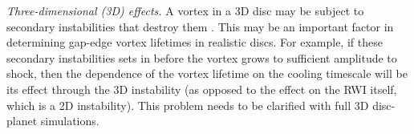 \emph{Three-dimensional (3D) effects.} A vortex in a 3D disc may be
subject to secondary instabilities that destroy them
\citep{lesur09,railton14}. This may be an important factor in
determining gap-edge vortex lifetimes in realistic discs. For example,
if these secondary instabilities sets in before the vortex grows to
sufficient amplitude to shock, then the dependence of the vortex
lifetime on the cooling timescale will be its effect through the 3D
instability (as opposed to the effect on the RWI itself, which is a 2D
instability). This problem needs to be clarified with full 3D
disc-planet simulations.  

